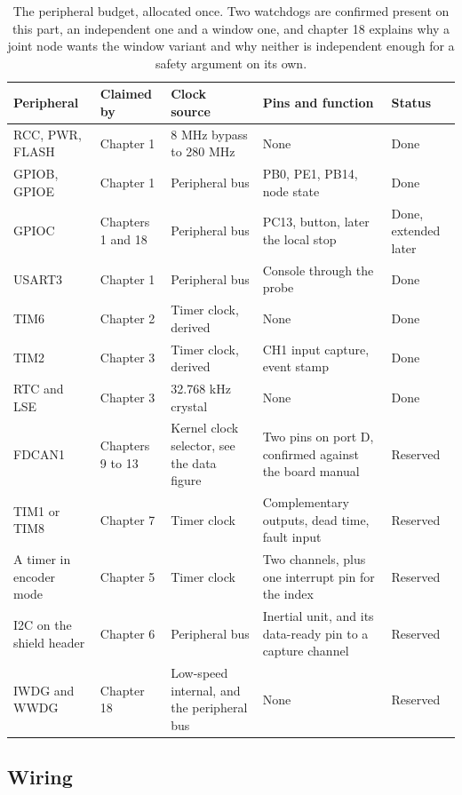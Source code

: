 \begin{table}[H]\centering\small
\begin{tabular}{p{22mm}p{26mm}p{24mm}p{30mm}p{30mm}}
\toprule
Peripheral & Claimed by & Clock source & Pins and function & Status \\
\midrule
RCC, PWR, FLASH & Chapter 1 & 8 MHz bypass to 280 MHz & None & Done \\
GPIOB, GPIOE & Chapter 1 & Peripheral bus & PB0, PE1, PB14, node state & Done \\
GPIOC & Chapters 1 and 18 & Peripheral bus & PC13, button, later the local stop & Done, extended later \\
USART3 & Chapter 1 & Peripheral bus & Console through the probe & Done \\
TIM6 & Chapter 2 & Timer clock, derived & None & Done \\
TIM2 & Chapter 3 & Timer clock, derived & CH1 input capture, event stamp & Done \\
RTC and LSE & Chapter 3 & 32.768 kHz crystal & None & Done \\
FDCAN1 & Chapters 9 to 13 & Kernel clock selector, see the data figure & Two pins on port D, confirmed against the board manual & Reserved \\
TIM1 or TIM8 & Chapter 7 & Timer clock & Complementary outputs, dead time, fault input & Reserved \\
A timer in encoder mode & Chapter 5 & Timer clock & Two channels, plus one interrupt pin for the index & Reserved \\
I2C on the shield header & Chapter 6 & Peripheral bus & Inertial unit, and its data-ready pin to a capture channel & Reserved \\
IWDG and WWDG & Chapter 18 & Low-speed internal, and the peripheral bus & None & Reserved \\
\bottomrule
\end{tabular}
\caption{The peripheral budget, allocated once. Two watchdogs are confirmed present on this part, an independent one and a window one, and chapter 18 explains why a joint node wants the window variant and why neither is independent enough for a safety argument on its own.}
\end{table}

\subsection*{Wiring}


